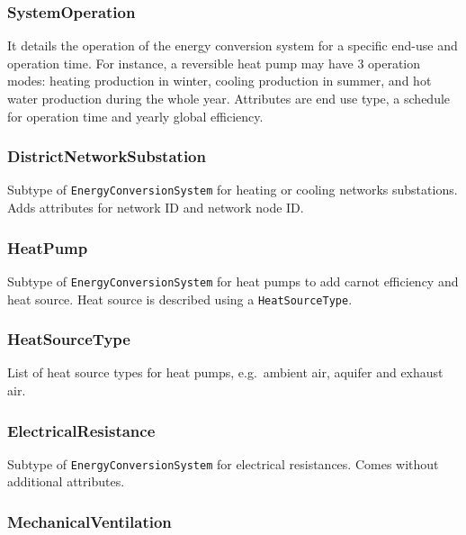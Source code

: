 \documentclass[a4paper,12pt]{article}
\begin{document}
\subsubsection{SystemOperation}\label{systemoperation}

It details the operation of the energy conversion system for a specific
end-use and operation time. For instance, a reversible heat pump may
have 3 operation modes: heating production in winter, cooling production
in summer, and hot water production during the whole year. Attributes
are end use type, a schedule for operation time and yearly global
efficiency.

\subsubsection{DistrictNetworkSubstation}\label{districtnetworksubstation}

Subtype of \texttt{EnergyConversionSystem} for heating or cooling
networks substations. Adds attributes for network ID and network node
ID.

\subsubsection{HeatPump}\label{heatpump}

Subtype of \texttt{EnergyConversionSystem} for heat pumps to add carnot
efficiency and heat source. Heat source is described using a
\texttt{HeatSourceType}.

\subsubsection{HeatSourceType}\label{heatsourcetype}

List of heat source types for heat pumps, e.g.~ambient air, aquifer and
exhaust air.

\subsubsection{ElectricalResistance}\label{electricalresistance}

Subtype of \texttt{EnergyConversionSystem} for electrical resistances.
Comes without additional attributes.

\subsubsection{MechanicalVentilation}\label{mechanicalventilation}
\end{document}
